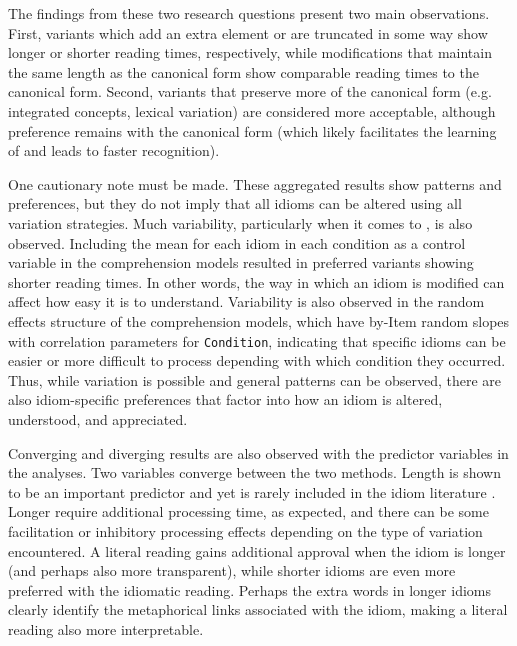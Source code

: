 \documentclass[output=paper
,modfonts
,nonflat]{langsci/langscibook}
\begin{document}
The findings from these two research questions present two main observations. First, variants  which add an extra element or are truncated in some way show longer or shorter reading times, respectively, while modifications that maintain the same length as the canonical form show comparable reading times to the canonical form. Second, variants that preserve more of the canonical form (e.g. integrated concepts, lexical variation) are considered more acceptable, although preference remains with the canonical form (which likely facilitates the learning of  and leads to faster recognition).

One cautionary note must be made. These aggregated results show patterns and preferences, but they do not imply that all idioms can be altered using all variation strategies. Much variability, particularly when it comes to , is also observed. Including the mean  for each idiom in each condition as a control variable in the comprehension models resulted in preferred variants showing shorter reading times. In other words, the way in which an idiom is modified can affect how easy it is to understand. Variability is also observed in the random effects structure of the comprehension models, which have by-Item random slopes with correlation parameters for \texttt{Condition}, indicating that specific idioms can be easier or more difficult to process depending with which condition they occurred. Thus, while variation  is possible and general patterns can be observed, there are also idiom-specific preferences that factor into how an idiom is altered, understood, and appreciated. 

   


Converging and diverging results  are also observed with the predictor variables in the analyses. Two variables converge between the two methods. Length is shown to be an important predictor and yet is rarely included in the idiom literature \citep[cf.][]{FanariEtAl2010}. Longer  require additional processing time, as expected, and there can be some facilitation or inhibitory processing effects depending on the type of variation encountered. A literal reading gains additional approval when the idiom is longer (and perhaps also more transparent), while shorter idioms are even more preferred with the idiomatic reading. Perhaps the extra words in longer idioms clearly identify the metaphorical links associated with the idiom, making a literal reading  also more interpretable.
\end{document}
